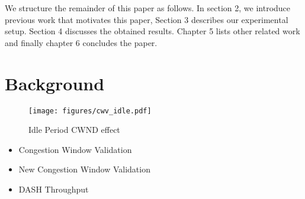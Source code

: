 \documentclass[10pt,sigconf]{acmart}
\begin{document}
We structure the remainder of this paper as follows. In section 2, we introduce previous work that motivates this paper, Section 3 describes our experimental setup. Section 4 discusses the obtained results. Chapter 5 lists other related work and finally chapter 6 concludes the paper.

\section{Background}
\label{sec:background}


\begin{figure*}
    \centering
    \texttt{[image: figures/cwv\_idle.pdf]}
    \caption{Idle Period CWND effect}
    \label{fig:idle_effect}
\end{figure*}

\begin{itemize}
    \item Congestion Window Validation
    \item New Congestion Window Validation
    \item DASH Throughput
\end{itemize}














\end{document}
